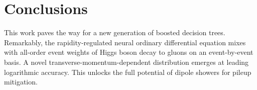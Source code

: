\section{Conclusions}\label{sec:conclusions}

This work paves the way for a new generation of boosted decision trees.
Remarkably, the rapidity-regulated neural ordinary differential equation
mixes with all-order event weights of Higgs boson decay to gluons on an
event-by-event basis. A novel transverse-momentum-dependent distribution
emerges at leading logarithmic accuracy. This unlocks the full potential
of dipole showers for pileup mitigation.

